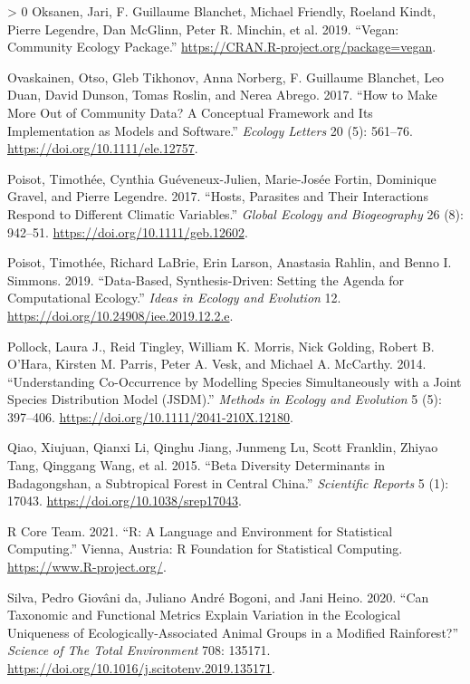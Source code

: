 \documentclass[10pt,oneside]{article}
\newlength{\cslhangindent}
\newenvironment{CSLReferences}[3] %
 {%
  \setlength{\parindent}{0pt}
  \ifodd #1 \everypar{\setlength{\hangindent}{\cslhangindent}}\ignorespaces\fi
  \ifnum #2 > 0
  \setlength{\parskip}{#2\baselineskip}
  \fi
 }%
 {}
\begin{document}
\begin{CSLReferences}{1}{0}
\leavevmode\hypertarget{ref-Oksanen2019VegCom}{}%
Oksanen, Jari, F. Guillaume Blanchet, Michael Friendly, Roeland Kindt,
Pierre Legendre, Dan McGlinn, Peter R. Minchin, et al. 2019. {``Vegan:
Community Ecology Package.''}
\url{https://CRAN.R-project.org/package=vegan}.

\leavevmode\hypertarget{ref-Ovaskainen2017HowMak}{}%
Ovaskainen, Otso, Gleb Tikhonov, Anna Norberg, F. Guillaume Blanchet,
Leo Duan, David Dunson, Tomas Roslin, and Nerea Abrego. 2017. {``How to
Make More Out of Community Data? A Conceptual Framework and Its
Implementation as Models and Software.''} \emph{Ecology Letters} 20 (5):
561--76. \url{https://doi.org/10.1111/ele.12757}.

\leavevmode\hypertarget{ref-Poisot2017HosPar}{}%
Poisot, Timothée, Cynthia Guéveneux-Julien, Marie-Josée Fortin,
Dominique Gravel, and Pierre Legendre. 2017. {``Hosts, Parasites and
Their Interactions Respond to Different Climatic Variables.''}
\emph{Global Ecology and Biogeography} 26 (8): 942--51.
\url{https://doi.org/10.1111/geb.12602}.

\leavevmode\hypertarget{ref-Poisot2019DatSyn}{}%
Poisot, Timothée, Richard LaBrie, Erin Larson, Anastasia Rahlin, and
Benno I. Simmons. 2019. {``Data-Based, Synthesis-Driven: Setting the
Agenda for Computational Ecology.''} \emph{Ideas in Ecology and
Evolution} 12. \url{https://doi.org/10.24908/iee.2019.12.2.e}.

\leavevmode\hypertarget{ref-Pollock2014UndCoo}{}%
Pollock, Laura J., Reid Tingley, William K. Morris, Nick Golding, Robert
B. O'Hara, Kirsten M. Parris, Peter A. Vesk, and Michael A. McCarthy.
2014. {``Understanding Co-Occurrence by Modelling Species Simultaneously
with a Joint Species Distribution Model (JSDM).''} \emph{Methods in
Ecology and Evolution} 5 (5): 397--406.
\url{https://doi.org/10.1111/2041-210X.12180}.

\leavevmode\hypertarget{ref-Qiao2015BetDiv}{}%
Qiao, Xiujuan, Qianxi Li, Qinghu Jiang, Junmeng Lu, Scott Franklin,
Zhiyao Tang, Qinggang Wang, et al. 2015. {``Beta Diversity Determinants
in Badagongshan, a Subtropical Forest in Central China.''}
\emph{Scientific Reports} 5 (1): 17043.
\url{https://doi.org/10.1038/srep17043}.

\leavevmode\hypertarget{ref-RCoreTeam2021RLan}{}%
R Core Team. 2021. {``R: A Language and Environment for Statistical
Computing.''} Vienna, Austria: R Foundation for Statistical Computing.
\url{https://www.R-project.org/}.

\leavevmode\hypertarget{ref-daSilva2020CanTax}{}%
Silva, Pedro Giovâni da, Juliano André Bogoni, and Jani Heino. 2020.
{``Can Taxonomic and Functional Metrics Explain Variation in the
Ecological Uniqueness of Ecologically-Associated Animal Groups in a
Modified Rainforest?''} \emph{Science of The Total Environment} 708:
135171. \url{https://doi.org/10.1016/j.scitotenv.2019.135171}.


\end{CSLReferences}
\end{document}
